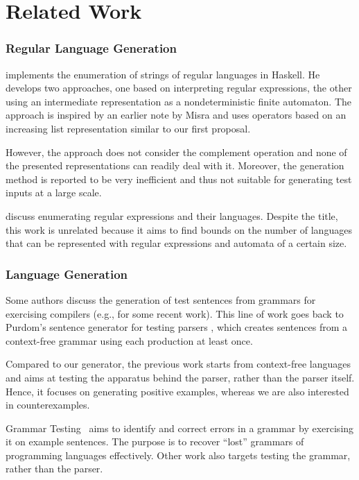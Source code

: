 \section{Related Work}
\label{sec:related-work}

\subsubsection*{Regular Language Generation}
\citet{DBLP:journals/jfp/McIlroy04} implements the enumeration of
strings of regular languages in Haskell. He develops two approaches,
one based on interpreting regular expressions, the other using an
intermediate representation as a nondeterministic finite
automaton. The approach is inspired by an earlier note by Misra
\cite{misra11:_enumer_strin_regul_expres} and uses operators based on
an increasing list representation similar to our first proposal.

However, the approach does not consider the complement operation and
none of the presented representations can readily deal with
it. Moreover, the generation method is reported to be very inefficient
and thus not suitable for generating test inputs at a large scale.

\citet{DBLP:conf/wia/LeeS04} discuss enumerating regular expressions
and their languages. Despite the title, this work is unrelated
because it aims to find bounds on the number of languages that can be
represented with regular expressions and automata of a certain size.


\subsubsection*{Language Generation}
Some authors discuss the generation of test sentences from grammars for
exercising compilers
(e.g., \cite{DBLP:conf/cisse/ParachaF08,DBLP:conf/compsac/ZhengW09}
for some recent work). This
line of work goes back to Purdom's sentence generator for testing
parsers \cite{purdom72:_senten_gener_testin_parser}, which creates
sentences from a context-free grammar using each production at least
once.

Compared to our generator, the previous work starts from context-free
languages and aims at testing the apparatus behind the parser,
rather than the parser itself. Hence, it focuses on generating
positive examples, whereas we are also interested in counterexamples.

Grammar Testing~\cite{DBLP:conf/fase/Lammel01} aims to
identify and correct errors in a grammar by exercising it on example
sentences. The purpose is to recover ``lost'' grammars of programming
languages effectively.
Other work \cite{DBLP:conf/compsac/LiJLG04} also targets
testing the grammar, rather than the parser.

